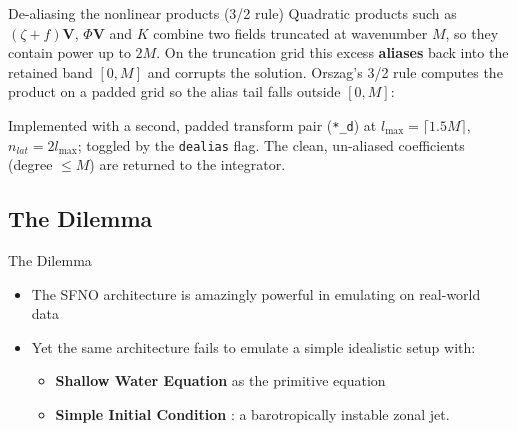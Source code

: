 \documentclass{beamer}
\begin{document}
\begin{frame}{De-aliasing the nonlinear products (3/2 rule)}
    \small
    Quadratic products such as $(\zeta+f)\mathbf V$, $\Phi\mathbf V$ and $K$ combine two fields
    truncated at wavenumber $M$, so they contain power up to $2M$. On the truncation grid this excess
    \textbf{aliases} back into the retained band $[0,M]$ and corrupts the solution. Orszag's 3/2 rule
    computes the product on a padded grid so the alias tail falls outside $[0,M]$:
    \begin{center}
    \end{center}
    Implemented with a second, padded transform pair (\texttt{*\_d}) at $l_{\max}=\lceil 1.5M\rceil$,
    $n_{lat}=2l_{\max}$; toggled by the \texttt{dealias} flag. The clean, un-aliased coefficients
    (degree $\le M$) are returned to the integrator.
\end{frame}

\subsection{The Dilemma}
\begin{frame}{The Dilemma}
    \begin{itemize}
        \item The SFNO architecture is amazingly powerful in emulating on real-world data 
        \item Yet the same architecture fails to emulate a simple idealistic setup with:
        \begin{itemize}
            \item \textbf{Shallow Water Equation} as the primitive equation
            \item \textbf{Simple Initial Condition} : a barotropically instable zonal jet. 
        \end{itemize}
    \end{itemize}
\end{frame}
\end{document}

